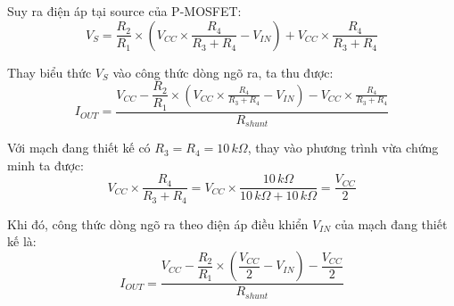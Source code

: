 Suy ra điện áp tại source của P-MOSFET:
\begin{equation*}
    V_S=
    \frac{R_2}{R_1}\times
    \left(V_{CC}\times\frac{R_4}{R_3+R_4}-V_{IN}\right)
    +
    V_{CC}\times\frac{R_4}{R_3+R_4}
\end{equation*}

Thay biểu thức $V_S$ vào công thức dòng ngõ ra, ta thu được:
\begin{equation}
    \boxed{
    I_{OUT}=
    \frac{
    V_{CC}
    -
    \dfrac{R_2}{R_1}\times
    \left(V_{CC}\times\frac{R_4}{R_3+R_4}-V_{IN}\right)
    -
    V_{CC}\times\frac{R_4}{R_3+R_4}
    }{R_{shunt}}
    }
\end{equation}

Với mạch đang thiết kế có $R_3=R_4=10\,k\Omega$, thay vào phương trình vừa chứng minh ta được:
\begin{equation*}
    V_{CC}\times\frac{R_4}{R_3+R_4}
    =
    V_{CC}\times\frac{10\,k\Omega}{10\,k\Omega+10\,k\Omega}
    =
    \frac{V_{CC}}{2}
\end{equation*}

Khi đó, công thức dòng ngõ ra theo điện áp điều khiển $V_{IN}$ của mạch đang thiết kế là:
\begin{equation}
    \label{eq:iout}
    \boxed{
    I_{OUT}=
    \frac{
    V_{CC}
    -
    \dfrac{R_2}{R_1}\times
    \left(\dfrac{V_{CC}}{2}-V_{IN}\right)
    -
    \dfrac{V_{CC}}{2}
    }{R_{shunt}}
    }
\end{equation}

